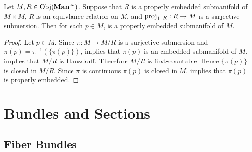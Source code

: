 \documentclass{book}
\begin{document}
	\begin{ex}
		Let $M, R \in \operatorname{Obj}(\operatorname*{\text{\textbf{Man}}^{\infty}})$. Suppose that $R$ is a properly embedded submanifold of $M \times M$, $R$ is an equivlance relation on $M$, and $\operatorname{\text{proj}}_1|_R:R \rightarrow M$ is a surjective submersion. Then for each $p \in M$, is a properly embedded submanifold of $M$. 
	\end{ex}

	\begin{proof}
		Let $p \in M$. Since $\pi: M \rightarrow M / R$ is a surjective submersion and $\pi(p) = \pi^{-1}(\{\pi(p)\})$,  implies that $\pi(p)$ is an embedded submanifold of $M$.  implies that $M/R$ is Hausdorff. Therefore $M/R$ is first-countable. Hence $\{\pi(p)\}$ is closed in $M/R$. Since $\pi$ is continuous $\pi(p)$ is closed in $M$.  implies that $\pi(p)$ is properly embedded.   
	\end{proof}

	
	
	
	
	
	
	
	
	
	
	
	
	
	
	
	
	
	
	
	
	
	
	
	
	
	
	
	
	
	
	
	
	
	
	
	
	
	
	
	
	
	
	
	
	
	
	
	
	
	\newpage
	\chapter{Bundles and Sections}
	
	\section{Fiber Bundles}
	
\end{document}

